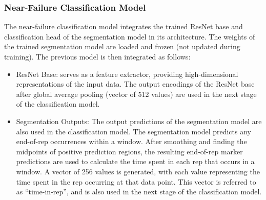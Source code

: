 \documentclass[conference]{IEEEtran}
\begin{document}
\subsubsection{Near-Failure Classification Model}
The near-failure classification model integrates the trained ResNet base and classification head of the segmentation model in its architecture. The weights of the trained segmentation model are loaded and frozen (not updated during training). The previous model is then integrated as follows:
\begin{itemize}
    \item ResNet Base: serves as a feature extractor, providing high-dimensional representations of the input data. The output encodings of the ResNet base after global average pooling (vector of 512 values) are used in the next stage of the classification model.
    \item Segmentation Outputs: The output predictions of the segmentation model are also used in the classification model. The segmentation model predicts any end-of-rep occurrences within a window. After smoothing and finding the midpoints of positive prediction regions, the resulting end-of-rep marker predictions are used to calculate the time spent in each rep that occurs in a window. A vector of 256 values is generated, with each value representing the time spent in the rep occurring at that data point. This vector is referred to as ``time-in-rep'', and is also used in the next stage of the classification model.
\end{itemize}
\end{document}
